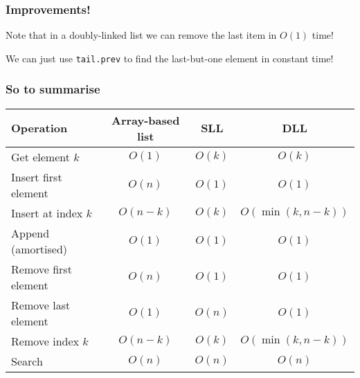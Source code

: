 \begin{frame}
	\frametitle{Improvements!}
	
			Note that in a doubly-linked list we can remove the last item in $O(1)$ time!
			
			We can just use \texttt{tail.prev} to find the last-but-one element in constant time!
			
\end{frame}

\begin{frame}
	\frametitle{So to summarise}

	\begin{tabular}{l | c | c | c}
	Operation & Array-based list & SLL & DLL \\	
	\midrule
	Get element $k$ & $O(1)$ &$O(k)$ & $O(k)$ \\
	
	Insert first element& $O(n)$ & $O(1)$ & $O(1)$\\
	Insert at index $k$& $O(n-k)$ & $O(k)$ & $O(\min(k,n-k))$\\
	Append (amortised)& $O(1)$ & $O(1)$ & $O(1)$\\
	
	Remove first element& $O(n)$ & $O(1)$ & $O(1)$\\
	Remove last element& $O(1)$ & $O(n)$ & $O(1)$\\
	Remove index $k$& $O(n-k)$ & $O(k)$ & $O(\min(k,n-k))$\\
	
	Search & $O(n)$ & $O(n)$ & $O(n)$\\
	\end{tabular}


\end{frame}

